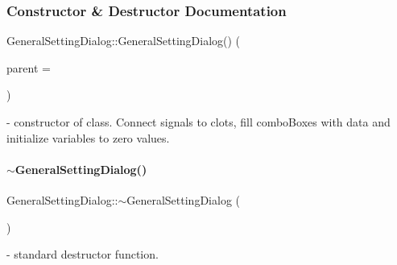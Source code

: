 \subsubsection{Constructor \& Destructor Documentation}
\mbox{\label{classGeneralSettingDialog_a04717ff5a0b42fb1ebeb5dcfc934cd83}}  
{\footnotesize\ttfamily General\+Setting\+Dialog\+::\texorpdfstring{General\+Setting\+Dialog()}{GeneralSettingDialog()} (\begin{DoxyParamCaption}\item[{Q\+Widget $\ast$}]{parent = {} }\end{DoxyParamCaption})}{\ttfamily [explicit]} - constructor of class. Connect signals to clots, fill combo\+Boxes with data and initialize variables to zero values.

\mbox{\label{classGeneralSettingDialog_a6e45c39d066344fdc3fd8556bed18cd3}} 
\paragraph{\texorpdfstring{$\sim$\+General\+Setting\+Dialog()}{~GeneralSettingDialog()}}
{\footnotesize\ttfamily General\+Setting\+Dialog\+::$\sim$\+General\+Setting\+Dialog (\begin{DoxyParamCaption}{ }\end{DoxyParamCaption})} - standard destructor function.

